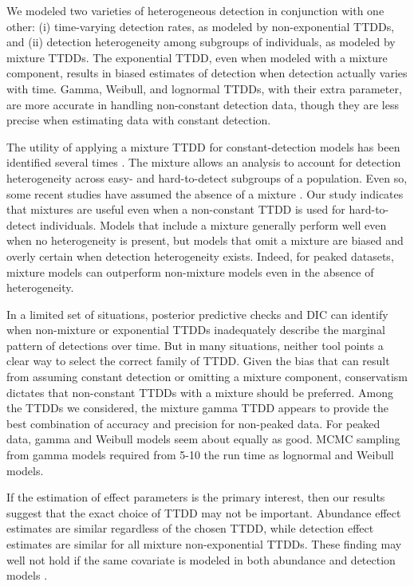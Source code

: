 \documentclass[useAMS,usenatbib,referee,12pt]{article}
\begin{document}
We modeled two varieties of heterogeneous detection in conjunction with one other: (i) time-varying detection rates, as modeled by non-exponential TTDDs, and (ii) detection heterogeneity among subgroups of individuals, as modeled by mixture TTDDs.  
The exponential TTDD, even when modeled with a mixture component, results in biased estimates of detection when detection actually varies with time.  
Gamma, Weibull, and lognormal TTDDs, with their extra parameter, are more accurate in handling non-constant detection data, though they are less precise when estimating data with constant detection.

The utility of applying a mixture TTDD for constant-detection models has been identified several times \citep{Pledger2000, Farnsworth2002, Alldredge2007, Reidy2011}.  
The mixture allows an analysis to account for detection heterogeneity across easy- and hard-to-detect subgroups of a population.  
Even so, some recent studies have assumed the absence of a mixture \citep{Solymos2013, Amundson2014}.  
Our study indicates that mixtures are useful even when a non-constant TTDD is used for hard-to-detect individuals.  
Models that include a mixture generally perform well even when no heterogeneity is present, but models that omit a mixture are biased and overly certain when detection heterogeneity exists.  
Indeed, for peaked datasets, mixture models can outperform non-mixture models even in the absence of heterogeneity.

In a limited set of situations, posterior predictive checks and DIC can identify when non-mixture or exponential TTDDs inadequately describe the marginal pattern of detections over time.  
But in many situations, neither tool points a clear way to select the correct family of TTDD.  
Given the bias that can result from assuming constant detection or omitting a mixture component, conservatism dictates that non-constant TTDDs with a mixture should be preferred.  
Among the TTDDs we considered, the mixture gamma TTDD appears to provide the best combination of accuracy and precision for non-peaked data.  
For peaked data, gamma and Weibull models seem about equally as good.  
MCMC sampling from gamma models required from 5-10 the run time as lognormal and Weibull models.

If the estimation of effect parameters is the primary interest, then our results suggest that the exact choice of TTDD may not be important.  
Abundance effect estimates are similar regardless of the chosen TTDD, while detection effect estimates are similar for all mixture non-exponential TTDDs.  
These finding may well not hold if the same covariate is modeled in both abundance and detection models \citep{Kery2008}.
\end{document}
